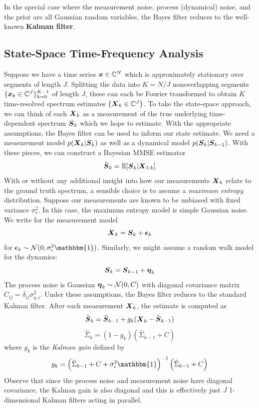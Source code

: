 \documentclass[twocolumn]{gwclass}
\newcommand{\C}{\mathbb{C}}
\begin{document}
In the special case where the measurement noise, process (dynamical) noise, and the prior are all Gaussian random variables, the Bayes filter reduces to the well-known \textbf{Kalman filter}.

\subsection{State-Space Time-Frequency Analysis}
Suppose we have a time series $\*x\in\C^N$ which is approximately stationary over segments of length $J$. Splitting the data into $K=N/J$ nonoverlapping segments $\{\*x_k\in\C^J\}_{k=0}^{K-1}$ of length $J$, these can each be Fourier transformed to obtain $K$ time-resolved spectrum estimates $\{\*X_k\in\C^J\}$. To take the state-space approach, we can think of each $\boldsymbol{X}_k$ as a measurement of the true underlying time-dependent spectrum $\boldsymbol{S}_k$ which we hope to estimate. With the appropriate assumptions, the Bayes filter can be used to inform our state estimate. We need a measurement model $p(\boldsymbol{X}_k|\boldsymbol{S}_k)$ as well as a dynamical model $p(\boldsymbol{S}_k|\boldsymbol{S}_{k-1})$. With these pieces, we can construct a Bayesian MMSE estimator
$$ \hat{\boldsymbol{S}}_k = \mathbb{E}[\boldsymbol{S}_k | \boldsymbol{X}_{1:k}] $$
With or without any additional insight into how our measurements $\boldsymbol{X}_k$ relate to the ground truth spectrum, a sensible choice is to assume a \emph{maximum entropy} distribution. Suppose our measurements are known to be unbiased with fixed variance $\sigma_\epsilon^2$. In this case, the maximum entropy model is simple Gaussian noise. We write for the measurement model
$$ \boldsymbol{X}_k = \boldsymbol{S}_k +\boldsymbol{\epsilon}_k $$
for $\*\epsilon_k\sim \mathcal{N}(0, \sigma_{\epsilon}^2 \mathbbm{1})$. Similarly, we might assume a random walk model for the dynamics:
$$ \boldsymbol{S}_k = \boldsymbol{S}_{k-1} + \boldsymbol{\eta}_k $$
The process noise is Gaussian $\boldsymbol{\eta}_k\sim\mathcal{N}(0,C)$ with diagonal covariance matrix $C_{ij} = \delta_{ij}\sigma_{\eta,i}^2$. Under these assumptions, the Bayes filter reduces to the standard Kalman filter. After each measurement $\boldsymbol{X}_k$, the estimate is computed as
$$ \hat{\boldsymbol{S}}_{k} = \hat{\boldsymbol{S}}_{k-1} + g_k(\boldsymbol{X}_k - \hat{\boldsymbol{S}}_{k-1}) $$
$$ \hat{\Sigma}_k = (1 - g_k)(\hat{\Sigma}_{k-1} + C) $$
where $g_k$ is the \emph{Kalman gain} defined by
$$g_k = \left(\hat{\Sigma}_{k-1} + C + \sigma_\epsilon^2\mathbbm{1}\right)^{-1} \left(\hat{\Sigma}_{k-1} + C\right)$$
Observe that since the process noise and measurement noise have diagonal covariance, the Kalman gain is also diagonal and this is effectively just $J$ 1-dimensional Kalman filters acting in parallel.
\end{document}
